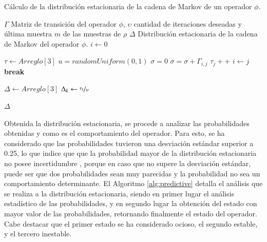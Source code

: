 \begin{algorithm}[!ht]
	\caption{Cálculo de la distribución estacionaria de la cadena de Markov de un operador $\phi$.}
	\label{alg:distEstacionaria}
	\begin{algorithmic}[1]
	\REQUIRE $\Gamma$ Matriz de transición del operador $\phi$, $\upsilon$ cantidad de iteraciones deseadas y última muestra $m$ de las muestras de $\rho$
	\ENSURE $\Delta$ Distribución estacionaria de la cadena de Markov del operador $\phi$.
	\STATE $i \leftarrow 0$ 
	\ELSE
	\ENDIF
	
	\STATE $\tau \leftarrow Arreglo[3]$ 
		\STATE $u = randomUniform(0,1)$
		\STATE $\sigma = 0$
			\STATE $\sigma = \sigma + \Gamma_{i,j}$
				\STATE $\tau_{j}++$
				\STATE $i \leftarrow j$
				\STATE \textbf{break}
			\ENDIF
		\ENDFOR
	\ENDFOR

	\STATE $\Delta \leftarrow Arreglo[3]$ 
		\STATE $\Delta_{k} \leftarrow \nicefrac{\tau_{k}}{\upsilon}$
	\ENDFOR	
	
	\RETURN $\Delta$
	
	\end{algorithmic}
\end{algorithm}

Obtenida la distribución estacionaria, se procede a analizar las probabilidades obtenidas y como es el comportamiento del operador. Para esto, se ha considerado que las probabilidades tuvieron una desviación estándar superior a 0.25, lo que indice que que la probabilidad mayor de la distribución estacionaria no posee incertidumbre \citep{soong2004fundamentals}, porque en caso que no supere la desviación estándar, puede ser que dos probabilidades sean muy parecidas y la probabilidad no sea un comportamiento determinante. El Algoritmo \ref{alg:predictive} detalla el análisis que se realiza a la distribución estacionaria, siendo en primer lugar el análisis estadístico de las probabilidades, y en segundo lugar la obtención del estado con mayor valor de las probabilidades, retornando finalmente el estado del operador. Cabe destacar que el primer estado se ha considerado ocioso, el segundo estable, y el tercero inestable.

